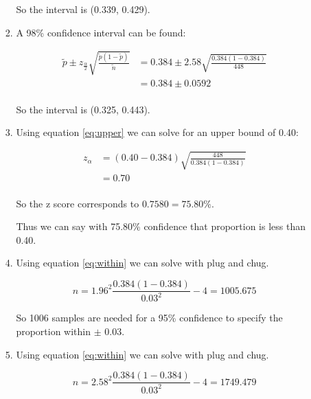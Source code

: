 \documentclass[12pt,letterpaper]{article}
\begin{document}
\begin{enumerate}
\begin{enumerate}
\begin{enumerate}[label=(\arabic*)]
              So the interval is (0.339, 0.429).
            \item
              A 98\% confidence interval can be found:

              \begin{align*}
                \tilde{p} \pm z_{\frac{\alpha}{2}} \sqrt{\frac{\tilde{p}(1 - \tilde{p})}{\tilde{n}}}
                &= 0.384 \pm 2.58 \sqrt{\frac{0.384(1 - 0.384)}{448}} \\
                &= 0.384 \pm 0.0592 \\
              \end{align*}

              So the interval is (0.325, 0.443).
            \item
              Using equation \ref{eq:upper} we can solve for an upper bound of 0.40:

              \begin{align*}
                z_\alpha &= (0.40 - 0.384)\sqrt{\frac{448}{0.384(1 - 0.384)}} \\
                &= 0.70 \\
              \end{align*}

              So the z score corresponds to $0.7580 = 75.80\%$.

              Thus we can say with 75.80\% confidence that proportion is less than 0.40.
            \item
              Using equation \ref{eq:within} we can solve with plug and chug.

              \[
                n = 1.96^2 \frac{0.384(1 - 0.384)}{0.03^2} - 4 = 1005.675
              \]

              So 1006 samples are needed for a 95\% confidence to specify the proportion within $\pm$ 0.03.
            \item
              Using equation \ref{eq:within} we can solve with plug and chug.

              \[
                n = 2.58^2 \frac{0.384(1 - 0.384)}{0.03^2} - 4 = 1749.479
              \]


\end{enumerate}
\end{enumerate}
\end{enumerate}
\end{document}
